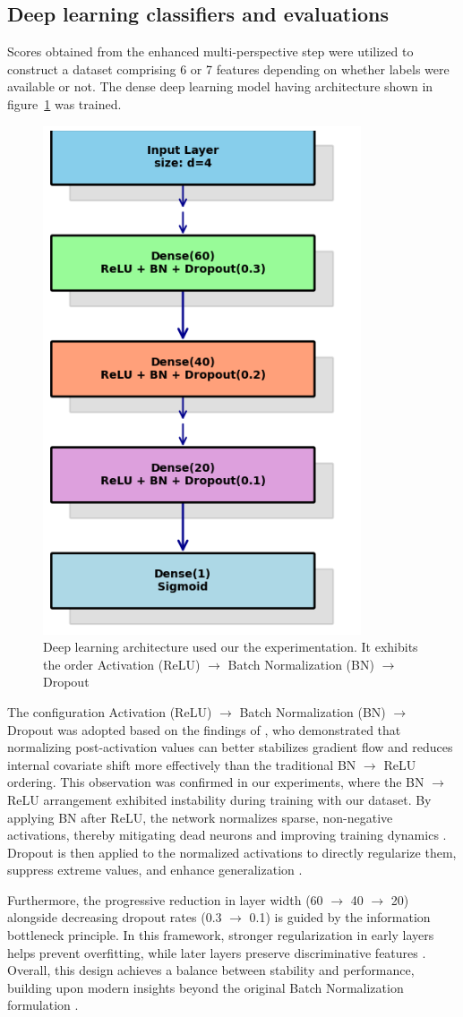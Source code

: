 \documentclass[preprint,12pt,authoryear]{elsarticle}
\begin{document}
\subsection{Deep learning classifiers and evaluations}
Scores obtained from the enhanced multi-perspective step were utilized to construct a dataset comprising 6 or 7 features depending on whether labels were available or not. The dense deep learning model having architecture shown in figure~\ref{Deeplearning} was trained.
\begin{figure}[H]
    \centering
\includegraphics[width=0.35\linewidth]{neuro network.png}
    \caption{Deep learning architecture used our the experimentation. It exhibits the order Activation (ReLU) $\rightarrow$ Batch Normalization (BN) $\rightarrow$ Dropout }
    \label{Deeplearning}
\end{figure}
The configuration Activation (ReLU) $\rightarrow$ Batch Normalization (BN) $\rightarrow$ Dropout was adopted based on the findings of \cite{ding2019acnet}, who demonstrated that normalizing post-activation values can better stabilizes gradient flow and reduces internal covariate shift more effectively than the traditional BN $\rightarrow$ ReLU ordering. This observation was confirmed in our experiments, where the BN $\rightarrow$ ReLU arrangement exhibited instability during training with our dataset. By applying BN after ReLU, the network normalizes sparse, non-negative activations, thereby mitigating dead neurons and improving training dynamics \citep{tensorflow_addons2021}. Dropout is then applied to the normalized activations to directly regularize them, suppress extreme values, and enhance generalization \citep{li2019understanding}.

Furthermore, the progressive reduction in layer width (60 $\rightarrow$ 40 $\rightarrow$ 20) alongside decreasing dropout rates (0.3 $\rightarrow$ 0.1) is guided by the information bottleneck principle. In this framework, stronger regularization in early layers helps prevent overfitting, while later layers preserve discriminative features \citep{labach2019survey, rippel2015spectral}. Overall, this design achieves a balance between stability and performance, building upon modern insights beyond the original Batch Normalization formulation \citep{ioffe2015batch}.
\end{document}
